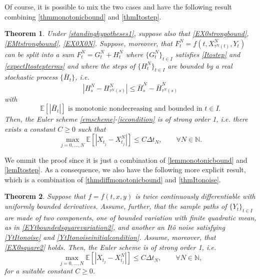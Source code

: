 \documentclass[reqno,12pt]{amsart}
\theoremstyle{plain}%
\newtheorem{thm}{Theorem}[section]
\theoremstyle{definition}
\begin{document}
Of course, it is possible to mix the two cases and have the following result combining \cref{thmmonotonicbound} and \cref{thmItostep}.

\begin{thm}
    \label{thmmixedcase}
    Under \cref{standinghypotheses1}, suppose also that
    \eqref{EX0strongbound}, \eqref{EMtstrongbound}, \eqref{EX0X0N}. Suppose, moreover, that $F_t^N = f(t, X_{\tau^N(t)}^N, Y_t)$ can be split into a sum $F_t^N = G_t^N + H_t^N$ where $\{G_t^N\}_{t\in I}$ satisfies \eqref{Itostep} and \eqref{expectItostepterms} and where the steps of $\{H_t^N\}_{t\in I}$ are bounded by a real stochastic process $\{\bar H_t\}$, i.e.
    \begin{equation}
        \label{stepHbound}
        |H_s^N - H_{\tau^N(s)}^N| \leq \bar H_s^N - \bar H_{\tau^N(s)}^N
    \end{equation}
    with
    \begin{equation}
      \label{expectstepHmonotonic}
      \mathbb{E}[|\bar H_t|] \textrm{ is monotonic nondecreasing and bounded in } t\in I.
    \end{equation}
    Then, the Euler scheme \eqref{emscheme}-\eqref{iccondition} is of strong order 1, i.e. there exists a constant $C\geq 0$ such that
    \begin{equation}
      \label{thmmixedtrongordernew}
        \max_{j=0, \ldots, N}\mathbb{E}\left[ \left| X_{t_j} - X_{t_j}^N \right| \right] \leq C \Delta t_N, \qquad \forall N \in \mathbb{N}.
    \end{equation}
\end{thm}

We ommit the proof since it is just a combination of \cref{lemmonotonicbound} and \cref{lemItostep}. As a consequence, we also have the following more explicit result, which is a combination of \cref{thmdiffmonotonicbound} and \cref{thmItonoise}.

\begin{thm}
    \label{thmmixedcasepractical}
    Suppose that $f=f(t, x, y)$ is twice continuously differentiable with uniformly bounded derivatives. Assume, further, that the sample paths of $\{Y_t\}_{t\in I}$ are made of two components, one of bounded variation with finite quadratic mean, as in \eqref{EYtboundedsquarevariation2}, and another an It\^o noise satisfying \eqref{YtItonoise} and \eqref{YtItonoiseinitialcondition}. Assume, moreover, that \eqref{EX0square2} holds. Then, the Euler scheme is of strong order 1, i.e.
    \begin{equation}
        \max_{j=0, \ldots, N}\mathbb{E}\left[ \left| X_{t_j} - X_{t_j}^N \right| \right] \leq C \Delta t_N, \qquad \forall N \in \mathbb{N},
    \end{equation}
    for a suitable constant $C \geq 0$.
\end{thm}
\end{document}
